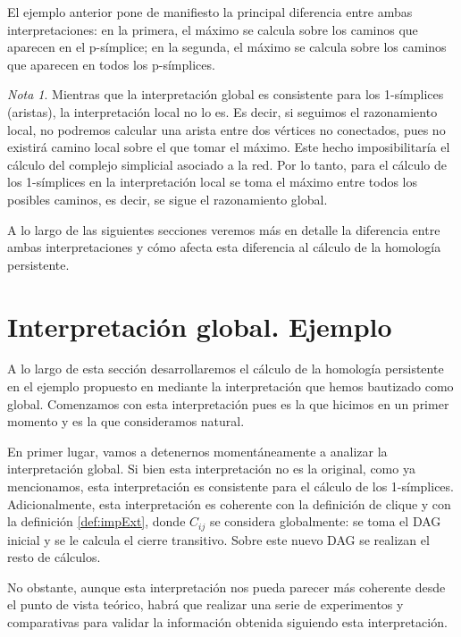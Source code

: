 \documentclass[12pt, a4paper, twoside]{book}
\numberwithin{equation}{section}
\theoremstyle{definition}
\theoremstyle{remark}
\newtheorem*{remark}{Nota}
\theoremstyle{plain}
\begin{document}
	El ejemplo anterior pone de manifiesto la principal diferencia 
	entre ambas interpretaciones: en la primera, el máximo se 
	calcula sobre los caminos que aparecen en el p-símplice; en la 
	segunda, el máximo se calcula sobre los caminos que aparecen 
	en todos los p-símplices.
	\begin{remark}
		Mientras que la interpretación global es consistente 
		para los 1-símplices (aristas), la interpretación 
		local no lo es. Es decir, si seguimos el razonamiento local, 
		no podremos calcular una arista entre dos vértices no 
		conectados, pues no existirá camino local sobre el que tomar 
		el máximo. Este hecho imposibilitaría el cálculo del complejo 
		simplicial asociado a la red. Por lo tanto, para el cálculo de 
		los 1-símplices en la interpretación local se toma el máximo 
		entre todos los posibles caminos, es decir, se sigue el 
		razonamiento global. 
	\end{remark}
	
	A lo largo de las siguientes secciones veremos más en detalle la 
	diferencia entre ambas interpretaciones y cómo afecta esta diferencia
	al cálculo de la homología persistente.

	\section{Interpretación global. Ejemplo}
	
	A lo largo de esta sección desarrollaremos el cálculo de la homología
	persistente en el ejemplo propuesto en \cite{Articulo-Watanabe} 
	mediante la interpretación que hemos bautizado como global. Comenzamos
	con esta interpretación pues es la que hicimos en un primer momento y 
	es la que consideramos natural.

	En primer lugar, vamos a detenernos momentáneamente a analizar la 
	interpretación global. Si bien esta interpretación no es la original, 
	como ya mencionamos, esta interpretación es consistente para el 
	cálculo de los 1-símplices. Adicionalmente, esta interpretación es 
	coherente con la definición de clique y con la definición 
	\ref{def:impExt}, donde $C_{ij}$ se considera globalmente: se toma el 
	DAG
	inicial y se le calcula el cierre transitivo. Sobre este nuevo DAG se
	realizan el resto de cálculos.

	No obstante, aunque esta interpretación nos pueda parecer más 
	coherente desde el punto de vista teórico, habrá que realizar una 
	serie de experimentos y comparativas para validar la información 
	obtenida siguiendo esta interpretación.
\end{document}
